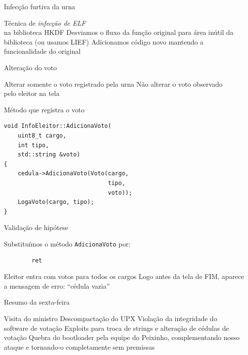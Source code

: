 \documentclass[14pt]{beamer}
\begin{document}
\begin{frame}{Infecção furtiva da urna}
  \begin{fullpageitemize}
    \itemR Técnica de \textit{infecção de ELF}\\ na biblioteca HKDF
    \itemR Desviamos o fluxo da função original para área inútil da biblioteca (ou usamos LIEF)
    \itemR Adicionamos código novo mantendo a funcionalidade do original
  \end{fullpageitemize}
\end{frame}

\begin{frame}{Alteração do voto}
  \begin{fullpageitemize}
    \itemR Alterar somente o voto registrado pela urna
    \itemR Não alterar o voto observado\\ pelo eleitor na tela
  \end{fullpageitemize}
\end{frame}

\begin{frame}[fragile]{Método que registra o voto}
  \begin{verbatim}
void InfoEleitor::AdicionaVoto(
    uint8_t cargo,
    int tipo,
    std::string &voto)
{
    cedula->AdicionaVoto(Voto(cargo,
                              tipo,
                              voto));
    LogaVoto(cargo, tipo);
}
  \end{verbatim}
\end{frame}

\begin{frame}[fragile]{Validação de hipótese}
  \begin{fullpageitemize}
    \itemR Substituímos o método \texttt{AdicionaVoto} por:
      \begin{verbatim}
        ret
      \end{verbatim}
    \vfill
    \itemR Eleitor entra com votos para todos os cargos
    \itemR Logo antes da tela de FIM, aparece a mensagem de erro: ``cédula vazia''
  \end{fullpageitemize}
\end{frame}

\begin{frame}{Resumo da sexta-feira}
  \begin{fullpageitemize}
    \itemR Visita do ministro
    \itemR Descompactação do UPX
    \itemR Violação da integridade do\\ software de votação
    \itemR Exploits para troca de strings e alteração de cédulas de votação
    \itemR Quebra do bootloader pela equipe do Peixinho, complementando nosso ataque e tornando-o completamente sem premissas
  \end{fullpageitemize}
\end{frame}
\end{document}
